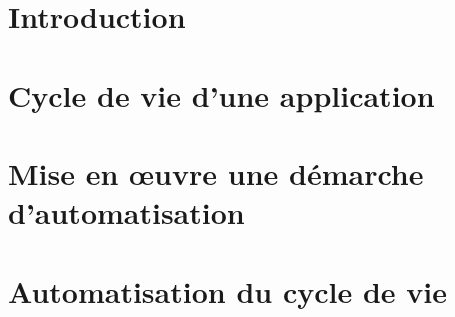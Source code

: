 \documentclass[11pt,a4paper]{article}
\begin{document}
	\section*{Introduction}
	
\newpage
	\pagestyle{fancy}
	
	\renewcommand{\sectionmark}[1]{\markright{#1}}
	\renewcommand{\subsectionmark}[1]{\markright{#1}}
	\renewcommand{\subsubsectionmark}[1]{\markright{#1}}
	
	\lhead{\fancyplain{}{}}
	\chead{\fancyplain{}}
	\rhead{\fancyplain{}{\rightmark}}
	
	\lfoot{\fancyplain{}{}}	
	\cfoot{\fancyplain{}{}}	
	\rfoot{\fancyplain{}{\thepage}}

  \section{Cycle de vie d'une application}
	
\newpage
	\section{Mise en œuvre une démarche d'automatisation}
	
\newpage
	\section{Automatisation du cycle de vie}
	
\newpage
	\pagestyle{plain} %
\end{document}
